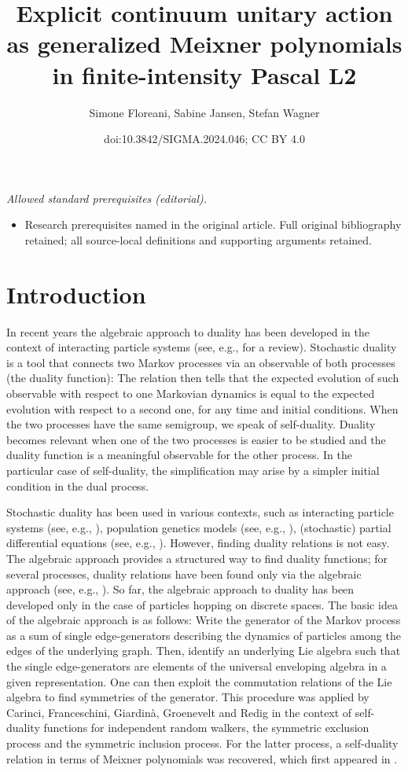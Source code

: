 \documentclass[10pt,a4paper]{amsart}
\title{Explicit continuum unitary action as generalized Meixner polynomials in finite-intensity Pascal L2}
\author{Simone Floreani, Sabine Jansen, Stefan Wagner}
\date{doi:10.3842/SIGMA.2024.046; CC BY 4.0}
\numberwithin{equation}{section}
\newcommand{\1}{\mathbbm{1}}
\begin{document}
\maketitle
\noindent\textit{Allowed standard prerequisites (editorial).}\begin{itemize}
\item Research prerequisites named in the original article. Full original bibliography retained; all source-local definitions and supporting arguments retained.
\end{itemize}\medskip
\section{Introduction}

In recent years the algebraic approach to duality has been developed in the context of interacting particle systems (see, e.g., \cite{sturm2020algebraic} for a review). Stochastic duality is a tool that connects two Markov processes via an observable of both processes (the duality function): The relation then tells that the expected evolution of such observable with respect to one Markovian dynamics is equal to the expected evolution with respect to a second one, for any time and initial conditions. When the two processes have the same semigroup, we speak of self-duality. Duality becomes relevant when one of the two processes is easier to be studied and the duality function is a meaningful observable for the other process. In the particular case of self-duality, the simplification may arise by a simpler initial condition in the dual process.

 Stochastic duality has been used in various contexts, such as interacting particle systems (see, e.g., \cite{liggett_interacting_2005}), population genetics models (see, e.g., \cite{etheridige06}), (stochastic) partial differential equations (see, e.g., \cite{Mueller15}). However, finding duality relations is not easy. The algebraic approach provides
a structured way to find duality functions; for several processes, duality relations have been found only via the algebraic approach (see, e.g., \cite{carinci2016asymmetric,carinci3367generalized,kuan2016stochastic,kuan2018algebraic}).
So far, the algebraic approach to duality has been developed only in the case of particles hopping on discrete spaces.
The basic idea of the algebraic approach is as follows: Write the generator of the Markov process as a sum of single edge-generators describing the dynamics of particles among the edges of the underlying graph. Then, identify an underlying Lie algebra such that the single edge-generators are elements of the universal enveloping algebra in a given representation. One can then exploit the commutation relations of the Lie algebra to find symmetries of the generator.
This procedure was applied by Carinci, Franceschini, Giardin\`a, Groenevelt and Redig in the context of self-duality functions for independent random walkers, the symmetric exclusion process and the symmetric inclusion process. For the latter process, a self-duality relation in terms of Meixner polynomials was recovered, which first appeared in \cite{franceschini2019stochastic}.
\end{document}
